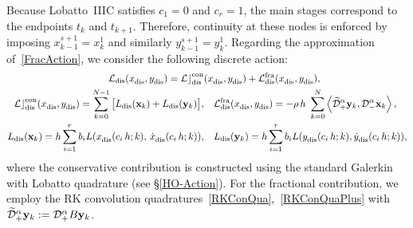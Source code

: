 \documentclass[a4paper,10pt,reqno]{amsart}
\theoremstyle{definition}
\newcommand{\Lc}{\mathcal{Lc}^{\text{con}}}
\newcommand{\Lf}{\mathcal{L}^{\text{fra}}}
\newcommand{\dis}{\text{dis}}
\begin{document}
Because Lobatto~IIIC satisfies 
$c_1=0$ and $c_r=1$, the main stages correspond to the endpoints $t_k$ and $t_{k+1}$. Therefore, continuity at these nodes is enforced by imposing $x_{k-1}^{s+1}=x_{k}^{1}$ and similarly $y_{k-1}^{s+1}=y_{k}^{1}$. Regarding the approximation of~\eqref{FracAction}, we consider the following discrete action:  
\begin{equation}\label{DiscFracActionHORK}
\begin{split}
\mathcal{L}_\dis(x_\dis^{},y_\dis^{})=\Lc_\dis&(x_\dis^{},y_\dis^{})+\Lf_\dis(x_\dis^{},y_\dis^{}), \\
\Lc_\dis(x_\dis^{},y_\dis^{})=\sum_{k=0}^{N-1}\big[L_\dis({\bf x}_k)+L_\dis({\bf y}_k)\big],&\quad \Lf_\dis(x_\dis^{},y_\dis^{})=-\rho\,h\,\,\sum_{k=0}^{N}\left\langle\widetilde{\mathcal{D}}^{\alpha}_{+}{\bf y}_k,\mathcal{D}^{\alpha}_{-}{\bf x}_k\right\rangle,\\
L_\dis({\bf x}_k)=h\sum_{i=1}^rb_iL(x_\dis^{}(c_i\,h;k),\,\dot x_\dis^{}(c_i\,h;k)),&\,\,\,\,\,\, L_\dis({\bf y}_k)=h\sum_{i=1}^rb_iL(y_\dis^{}(c_i\,h;k),\dot y_\dis^{}(c_i\,h;k)),
\end{split}
\end{equation}
where the conservative contribution is constructed using the standard Galerkin with Lobatto quadrature (see \S\ref{HO-Action}). For the fractional contribution, we employ the RK convolution quadratures~\eqref{RKConQua},~\eqref{RKConQuaPlus} with $\widetilde{\mathcal{D}}^{\alpha}_{+}{\bf y}_k:=\mathcal{D}^{\alpha}_{+}B{\bf  y}_k$. 
\end{document}
